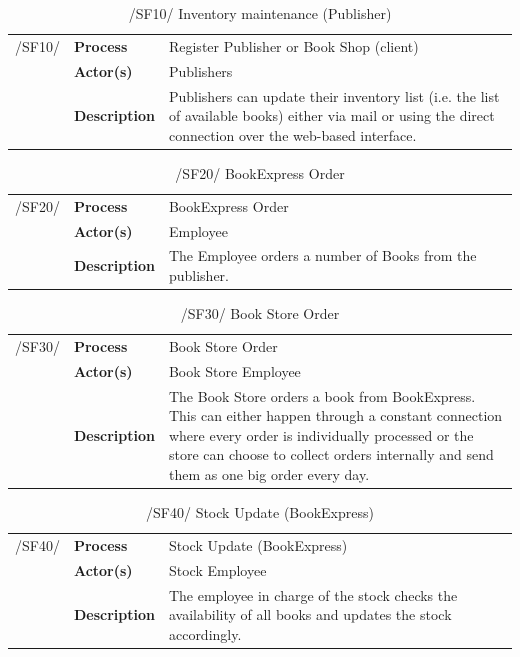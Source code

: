 \documentclass[11pt,a4paper,oneside,svgnames]{report}
\begin{document}
\begin{table}[H]
\centering
\begin{tabular}{p{1.5cm}p{3cm}p{8cm}}
\cellcolor{white}/SF10/	& \textbf{Process}	& Register Publisher or Book Shop (client)\\
\cellcolor{white}		& \textbf{Actor(s)} & Publishers \\
\cellcolor{white}		& \textbf{Description}	 & Publishers can update their inventory list (i.e. the list of available books) either via mail or using the direct connection over the web-based interface. \\
\end{tabular}
\caption{/SF10/ Inventory maintenance (Publisher)}
\end{table}

\begin{table}[H]
\centering
\begin{tabular}{p{1.5cm}p{3cm}p{8cm}}
\cellcolor{white}/SF20/	& \textbf{Process}	& BookExpress Order \\
\cellcolor{white}		& \textbf{Actor(s)} & Employee \\
\cellcolor{white}		& \textbf{Description}	 &  The Employee orders a number of Books from the publisher.\\
\end{tabular}
\caption{/SF20/ BookExpress Order}
\end{table}

\begin{table}[H]
\centering
\begin{tabular}{p{1.5cm}p{3cm}p{8cm}}
\cellcolor{white}/SF30/	& \textbf{Process}	& Book Store Order \\
\cellcolor{white}		& \textbf{Actor(s)} &  Book Store Employee \\
\cellcolor{white}		& \textbf{Description}	 &  The Book Store orders a book from BookExpress. This can either happen through a constant connection where every order is individually processed or the store can choose to collect orders internally and send them as one big order every day. \\
\end{tabular}
\caption{/SF30/ Book Store Order}
\end{table}

\begin{table}[H]
\centering
\begin{tabular}{p{1.5cm}p{3cm}p{8cm}}
\cellcolor{white}/SF40/	& \textbf{Process}	&  Stock Update (BookExpress)\\
\cellcolor{white}		& \textbf{Actor(s)} &  Stock Employee  \\
\cellcolor{white}		& \textbf{Description}	 & The employee in charge of the stock checks the availability of all books and updates the stock accordingly. \\
\end{tabular}
\caption{/SF40/  Stock Update (BookExpress)}
\end{table}
\end{document}
